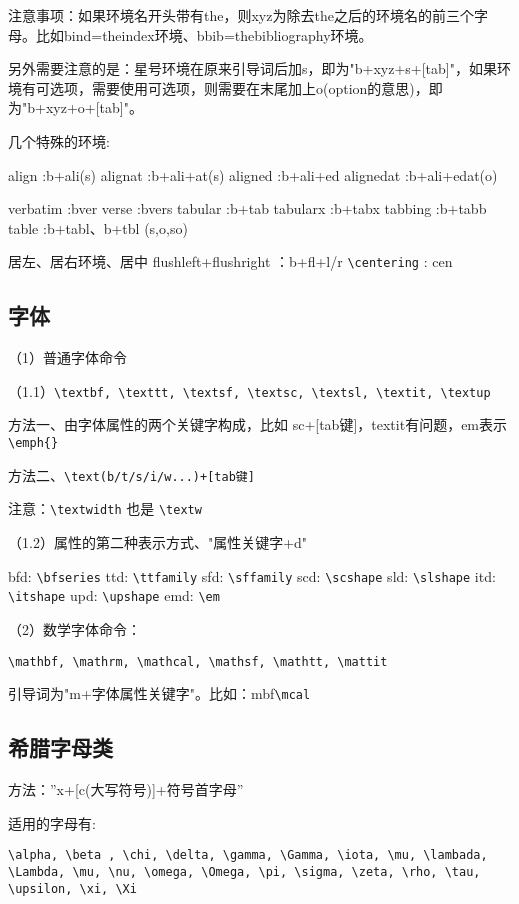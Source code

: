 注意事项：如果环境名开头带有the，则xyz为除去the之后的环境名的前三个字母。比如bind=theindex环境、bbib=thebibliography环境。
 
另外需要注意的是：星号环境在原来引导词后加s，即为"b+xyz+s+[tab]"，如果环境有可选项，需要使用可选项，则需要在末尾加上o(option的意思)，即为"b+xyz+o+[tab]"。
 
几个特殊的环境:

align    :b+ali(s)
alignat   :b+ali+at(s)
aligned  :b+ali+ed
alignedat :b+ali+edat(o)
 
verbatim  :bver
verse    :bvers
tabular   :b+tab
tabularx  :b+tabx
tabbing  :b+tabb
table    :b+tabl、b+tbl (s,o,so)
 
居左、居右环境、居中
flushleft+flushright ：b+fl+l/r
\verb|\centering|         : cen
 
 
 
 \subsection{字体}
（1）普通字体命令

（1.1）\verb|\textbf, \texttt, \textsf, \textsc, \textsl, \textit, \textup|

   方法一、由字体属性的两个关键字构成，比如 sc+[tab键]，textit有问题，em表示\verb|\emph{}|
   
   方法二、\verb|\text(b/t/s/i/w...)+[tab键]|
   
   注意：\verb|\textwidth| 也是 \verb|\textw|

（1.2）属性的第二种表示方式、"属性关键字+d"

    bfd: \verb|\bfseries|
    ttd: \verb|\ttfamily|
    sfd: \verb|\sffamily|
    scd: \verb|\scshape|
    sld:  \verb|\slshape|
    itd:  \verb|\itshape|
    upd: \verb|\upshape|
    emd: \verb|\em|
 
（2）数学字体命令：
    
  \verb|\mathbf, \mathrm, \mathcal, \mathsf, \mathtt, \mattit|
  
    引导词为"m+字体属性关键字"。比如：mbf\verb|\mcal|
 

 
 \subsection{希腊字母类}
方法：”x+[c(大写符号)]+符号首字母”

适用的字母有:
\begin{verbatim}
\alpha, \beta , \chi, \delta, \gamma, \Gamma, \iota, \mu, \lambada,
\Lambda, \mu, \nu, \omega, \Omega, \pi, \sigma, \zeta, \rho, \tau,
\upsilon, \xi, \Xi
\end{verbatim}


